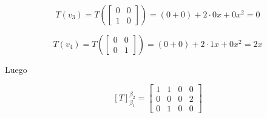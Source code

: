\documentclass{report}
\begin{document}
\begin{Example}
        $$T(v_3) = T \left(\begin{bmatrix}
            0 & 0 \\
            1 & 0
        \end{bmatrix}\right) = (0 + 0) + 2\cdot 0x + 0x^2 = 0$$

        $$T(v_4) = T \left(\begin{bmatrix}
            0 & 0 \\
            0 & 1
        \end{bmatrix}\right) = (0 + 0) + 2\cdot 1x + 0x^2 = 2x$$

        Luego

        $$[T]_{\beta_1}^{\beta_2} = \begin{bmatrix}
            1 & 1 & 0 & 0\\
            0 & 0 & 0 & 2\\
            0 & 1 & 0 & 0
        \end{bmatrix}$$
    \end{Example}
\end{document}

